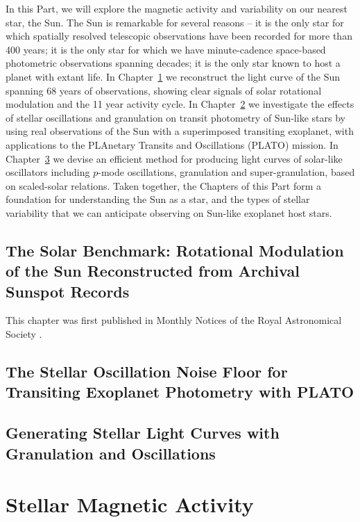 \documentclass[12pt, twoside]{uwthesis}
\begin{document}
In this Part, we will explore the magnetic activity and variability on our nearest star, the Sun. The Sun is remarkable for several reasons -- it is the only star for which spatially resolved telescopic observations have been recorded for more than 400 years; it is the only star for which we have minute-cadence space-based photometric observations spanning decades; it is the only star known to host a planet with extant life. In Chapter~\ref{chap:solarbenchmark} we reconstruct the light curve of the Sun spanning 68 years of observations, showing clear signals of solar rotational modulation and the 11 year activity cycle. In Chapter~\ref{chap:plato} we investigate the effects of stellar oscillations and granulation on transit photometry of Sun-like stars by using real observations of the Sun with a superimposed transiting exoplanet, with applications to the PLAnetary Transits and Oscillations (PLATO) mission. In Chapter~\ref{chap:astero} we devise an efficient method for producing light curves of solar-like oscillators including $p$-mode oscillations, granulation and super-granulation, based on scaled-solar relations. Taken together, the Chapters of this Part form a foundation for understanding the Sun as a star, and the types of stellar variability that we can anticipate observing on Sun-like exoplanet host stars.     

\chapter{The Solar Benchmark: Rotational Modulation of the Sun Reconstructed from Archival Sunspot Records} \label{chap:solarbenchmark}

This chapter was first published in Monthly Notices of the Royal Astronomical Society \citep{Morris2019a}. 



\chapter{The Stellar Oscillation Noise Floor for Transiting Exoplanet Photometry with PLATO} \label{chap:plato}

\chapter{Generating Stellar Light Curves with Granulation and Oscillations} \label{chap:astero}

\part{Stellar Magnetic Activity} \label{part:activity}
\end{document}
